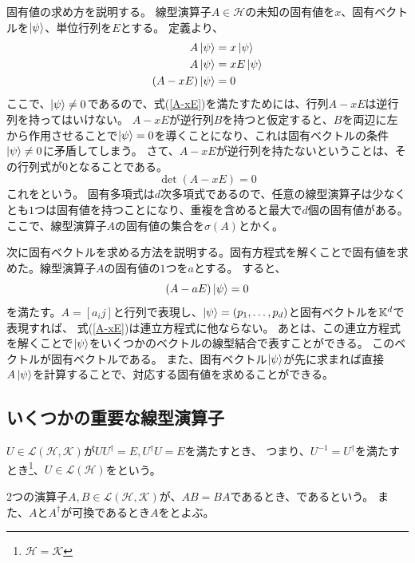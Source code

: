 固有値の求め方を説明する。
線型演算子$A\in\mathcal{H}$の未知の固有値を$x$、固有ベクトルを$\ket{\psi}$、単位行列を$E$とする。
定義より、
\begin{align}
  A\ket{\psi} &= x\ket{\psi} \\
  A\ket{\psi} &= xE\ket{\psi} \\
  (A-xE)\ket{\psi} &= 0 \label{A-xE}
\end{align}
ここで、$\ket{\psi} \neq 0$であるので、式(\ref{A-xE})を満たすためには、行列$A-xE$は逆行列を持ってはいけない。
$A-xE$が逆行列$B$を持つと仮定すると、$B$を両辺に左から作用させることで$\ket{\psi} = 0$を導くことになり、これは固有ベクトルの条件$\ket{\psi} \neq 0$に矛盾してしまう。
さて、$A-xE$が逆行列を持たないということは、その行列式が$0$となることである。
\begin{equation}
  \det{(A-xE)} = 0
\end{equation}
これをという。
固有多項式は$d$次多項式であるので、任意の線型演算子は少なくとも$1$つは固有値を持つことになり、重複を含めると最大で$d$個の固有値がある。
ここで、線型演算子$A$の固有値の集合を$\sigma(A)$とかく。

次に固有ベクトルを求める方法を説明する。固有方程式を解くことで固有値を求めた。線型演算子$A$の固有値の$1$つを$a$とする。
すると、
\begin{equation}
  (A-aE)\ket{\psi} = 0 \label{A-aE}
\end{equation}
を満たす。$A = [a_ij]$と行列で表現し、$\ket{\psi} = (p_1,\ldots,p_d)$と固有ベクトルを$\mathbb{K}^d$で表現すれば、
式(\ref{A-xE})は連立方程式に他ならない。
あとは、この連立方程式を解くことで$\ket{\psi}$をいくつかのベクトルの線型結合で表すことができる。
このベクトルが固有ベクトルである。
また、固有ベクトル$\ket{\psi}$が先に求まれば直接$A\ket{\psi}$を計算することで、対応する固有値を求めることができる。



\subsection{いくつかの重要な線型演算子}
\begin{Def}
  $U\in\mathcal{L}(\mathcal{H},\mathcal{K})$が$UU^\dagger = E, U^\dagger U = E$を満たすとき、
  つまり、$U^{-1} = U^\dagger$を満たすとき\footnote{$\mathcal{H}=\mathcal{K}$}、$U \in \mathcal{L}(\mathcal{H})$をという。
\end{Def}

$2$つの演算子$A,B\in\mathcal{L}(\mathcal{H},\mathcal{K})$が、$AB=BA$であるとき、であるという。
また、$A$と$A^\dagger$が可換であるとき$A$をとよぶ。

